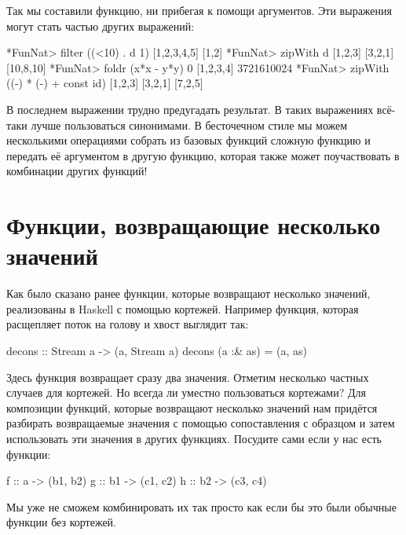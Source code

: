 
Так мы составили функцию, ни прибегая к помощи аргументов.
Эти выражения могут стать частью других выражений:

\begin{code}
*FunNat> filter  ((<10) . d 1) [1,2,3,4,5]
[1,2]
*FunNat> zipWith d [1,2,3] [3,2,1]
[10,8,10]
*FunNat> foldr (x*x - y*y) 0 [1,2,3,4]
3721610024
*FunNat> zipWith ((-) * (-) + const id) [1,2,3] [3,2,1]
[7,2,5]
\end{code}

В последнем выражении трудно предугадать результат. В таких
выражениях всё-таки лучше пользоваться синонимами.
В бесточечном стиле мы можем 
несколькими операциями собрать из базовых функций
сложную функцию и передать её аргументом в другую функцию,
которая также может поучаствовать в комбинации других
функций!

\section{Функции, возвращающие несколько значений}

Как было сказано ранее функции, которые возвращают несколько 
значений, реализованы в Haskell с помощью кортежей. 
Например функция, которая расщепляет поток на голову и хвост выглядит так:

\begin{code}
decons :: Stream a -> (a, Stream a)
decons (a :& as) = (a, as)
\end{code}

Здесь функция возвращает сразу два значения. Отметим несколько
частных случаев для кортежей. Но всегда ли уместно пользоваться 
кортежами? Для композиции функций, которые возвращают несколько
значений нам придётся разбирать возвращаемые значения
с помощью сопоставления с образцом и затем использовать
эти значения в других функциях. Посудите сами если у нас
есть функции:

\begin{code}
f :: a  -> (b1, b2)
g :: b1 -> (c1, c2)
h :: b2 -> (c3, c4)
\end{code}

Мы уже не сможем комбинировать их так просто как если бы
это были обычные функции без кортежей. 


